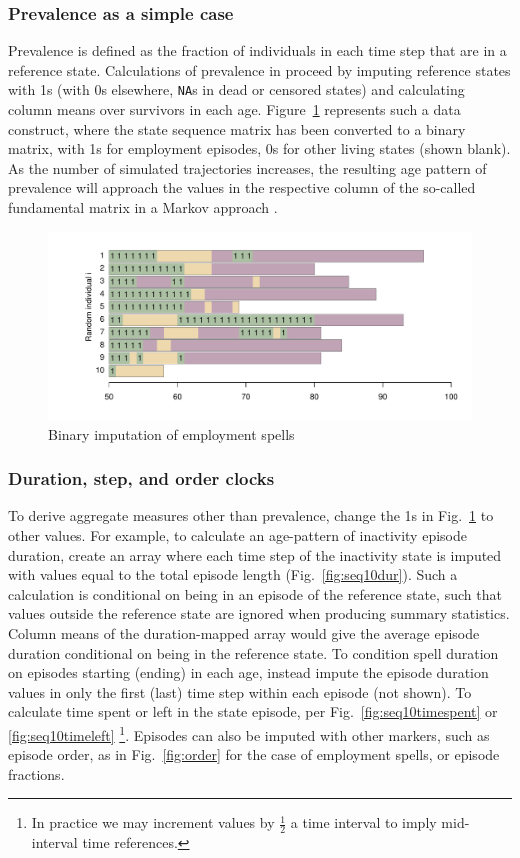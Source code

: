 \documentclass[a4paper,left=1.25cm,right=1.25cm,top=1.25cm,bottom=1.25cm]{article}
\begin{document}
\subsubsection{Prevalence as a simple case}
Prevalence is defined as the fraction of individuals in each time step that are in a reference state. Calculations of prevalence in proceed by imputing reference states with 1s (with 0s elsewhere, \texttt{NA}s in dead or censored states) and calculating column means over survivors in each age. Figure~\ref{fig:seq10ones} represents such a data construct, where the state sequence matrix has been converted to a binary matrix, with 1s for employment episodes, 0s for other living states (shown blank). As the number of simulated trajectories increases, the resulting age pattern of prevalence will approach the values in the respective column of the so-called fundamental matrix in a Markov approach \citep{caswell2018matrix}.

\begin{figure}[ht!]
\centering
\includegraphics[scale=.5]{Figures/Seq10ones.pdf}
\caption{Binary imputation of employment spells}
\label{fig:seq10ones}
\end{figure}

\subsubsection{Duration, step, and order clocks}
To derive aggregate measures other than prevalence, change the 1s in Fig.~\ref{fig:seq10ones} to other values. For example, to calculate an age-pattern of inactivity episode duration, create an array where each time step of the inactivity state is imputed with values equal to the total episode length (Fig.~\ref{fig:seq10dur}). Such a calculation is conditional on being in an episode of the reference state, such that values outside the reference state are ignored when producing summary statistics. Column means of the duration-mapped array would give the average episode duration conditional on being in the reference state. 
To condition spell duration on episodes starting (ending) in each age, instead impute the episode duration values in only the first (last) time step within each episode (not shown). To calculate time spent or left in the state episode, per Fig.~\ref{fig:seq10timespent} or \ref{fig:seq10timeleft} \footnote{In practice we may increment values by $\frac{1}{2}$ a time interval to imply mid-interval time references.}. Episodes can also be imputed with other markers, such as episode order, as in Fig.~\ref{fig:order} for the case of employment spells, or episode fractions. 
\end{document}
